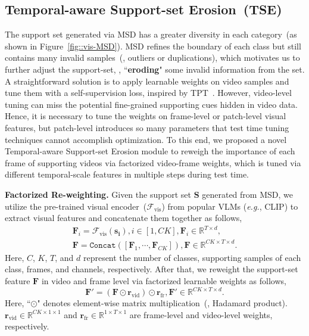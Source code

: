\subsection{Temporal-aware Support-set Erosion~(TSE)}
\label{sec::TSE}
{
The support set generated via MSD has a greater diversity in each category~(as shown in Figure~\ref{fig::vis-MSD}). MSD refines the boundary of each class but still 
contains many invalid samples~(\ie, outliers or duplications), which motivates us to further adjust the support-set, \ie, ``\textbf{eroding}" some invalid information from the set. A straightforward solution is to apply learnable weights on video samples and tune them with a self-supervision loss, inspired by TPT~\cite{shu2022tpt}. {However, video-level tuning can miss the potential fine-grained supporting cues hidden in video data. Hence, it is necessary to tune the weights on frame-level or patch-level visual features, but patch-level introduces so many parameters that test time tuning techniques cannot accomplish optimization.}
To this end, we proposed a novel Temporal-aware Support-set Erosion module to reweigh the importance of each frame of supporting videos via factorized video-frame weights, which is tuned via different temporal-scale features in multiple steps during test time. 


\noindent\textbf{Factorized Re-weighting.}
Given the support set $\bm{S}$ generated from MSD, we utilize the pre-trained visual encoder~($\mathcal{F}_\mathrm{vis}$) from popular VLMs (\emph{e.g.}, CLIP) to extract visual features and concatenate them together as follows,
\begin{equation}
\begin{gathered}
\bm{F}_i =\mathcal{F}_\mathrm{vis}(\bm{s_{i}}), i \in [1, CK], \bm{F}_i\in\mathbb{R}^{T \times d},\\
\bm{F} = \texttt{Concat}([\bm{F}_1,\cdots,\bm{F}_{CK}]), \bm{F} \in \mathbb{R}^{CK \times T \times d}.
\end{gathered}
\end{equation}
Here, $C$, $K$, $T$, and $d$ represent the number of classes, supporting samples of each class, frames, and channels, respectively.
After that, we reweight the support-set feature $\bm{F}$ in video and frame level via factorized learnable weights as follows,
\begin{equation}
\bm{F}' = (\bm{F} \odot \bm{r}_\mathrm{vid})\odot \bm{r}_\mathrm{fr}, \bm{F}' \in \mathbb{R}^{CK \times T \times d}.\label{eq::F_re}
\end{equation}
Here, ``$\odot$" denotes element-wise matrix multiplication~(\ie, Hadamard product). $\bm{r}_\mathrm{vid} \in \mathbb{R}^{CK \times 1 \times 1}$ and $\bm{r}_\mathrm{fr} \in \mathbb{R}^{1 \times T \times 1}$ are frame-level and video-level weights, respectively. 

}
